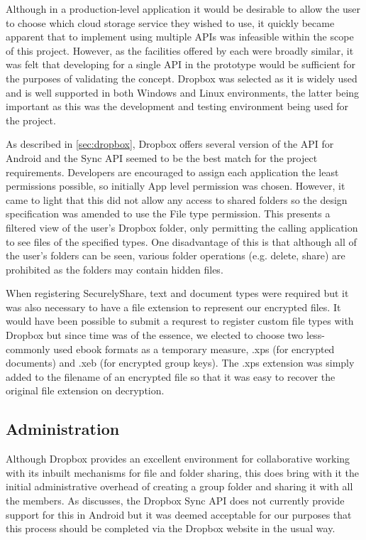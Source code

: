 Although in a production-level application it would be desirable to allow the user to choose which cloud storage service they wished to use, it quickly became apparent that to implement using multiple APIs was infeasible within the scope of this project.  However, as the facilities offered by each were broadly similar, it was felt that developing for a single API in the prototype would be sufficient for the purposes of validating the concept.  Dropbox was selected as it is widely used and is well supported in both Windows and Linux environments, the latter being important as this was the development and testing environment being used for the project.  

As described in \ref{sec:dropbox}, Dropbox offers several version of the API for Android and the Sync API seemed to be the best match for the project requirements.  Developers are encouraged to assign each application the least permissions possible, so initially App level permission was chosen.  However, it came to light that this did not allow any access to shared folders so the design specification was amended to use the File type permission.  This presents a filtered view of the user's Dropbox folder, only permitting the calling application to see files of the specified types.  One disadvantage of this is that although all of the user's folders can be seen, various folder operations (e.g. delete, share) are prohibited as the folders may contain hidden files.  

When registering SecurelyShare, text and document types were required but it was also necessary to have a file extension to represent our encrypted files.  It would have been possible to submit a requrest to register custom file types with Dropbox but since time was of the essence, we elected to choose two less-commonly used ebook formats as a temporary measure, .xps (for encrypted documents) and .xeb (for encrypted group keys).  The .xps extension was simply added to the filename of an encrypted file so that it was easy to recover the original file extension on decryption.
\subsection*{Administration}
Although Dropbox provides an excellent environment for collaborative working with its inbuilt mechanisms for file and folder sharing, this does bring with it the initial administrative overhead of creating a group folder and sharing it with all the members.  As discusses, the Dropbox Sync API does not currently provide support for  this in Android but it was deemed acceptable for our purposes that this process should be completed via the Dropbox website in the usual way.  

